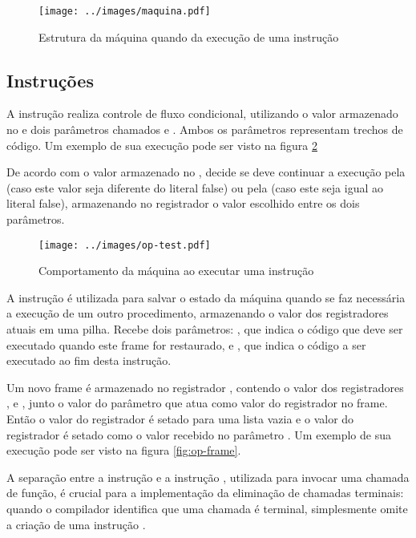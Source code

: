 \begin{figure}[h!]
\centering
\texttt{[image: ../images/maquina.pdf]}
\caption{Estrutura da máquina quando da execução de uma instrução }
\label{fig:maquina}
\end{figure}


\subsection{Instruções}
\label{ss:instrucoes}

A instrução  realiza controle de fluxo condicional, utilizando o
valor armazenado no  e dois parâmetros chamados
 e . Ambos os parâmetros representam
trechos de código. Um exemplo de sua execução pode ser visto na figura
\ref{fig:op-test}

De acordo com o valor armazenado no , decide se deve continuar
a execução pela  (caso este valor seja diferente do literal
false) ou pela  (caso este seja igual ao literal false),
armazenando no registrador  o valor escolhido entre os dois
parâmetros.

\begin{figure}[h!]
\centering
\texttt{[image: ../images/op-test.pdf]}
\caption{Comportamento da máquina ao executar uma instrução }
\label{fig:op-test}
\end{figure}

A instrução  é utilizada para salvar o estado da
máquina quando se faz necessária a execução de um outro procedimento,
armazenando o valor dos registradores atuais em uma pilha. Recebe dois
parâmetros: , que indica o código que deve ser executado quando
este frame for restaurado, e , que indica o código a ser
executado ao fim desta instrução.

Um novo frame é armazenado no registrador , contendo o valor dos
registradores ,  e , junto o valor do
parâmetro  que atua como valor do registrador  no
frame. Então o valor do registrador  é setado para uma lista vazia
e o valor do registrador  é setado como o valor recebido no
parâmetro . Um exemplo de sua execução pode ser visto na figura
\ref{fig:op-frame}.

A separação entre a instrução  e a instrução ,
utilizada para invocar uma chamada de função, é crucial para a implementação da
eliminação de chamadas terminais: quando o compilador identifica que uma
chamada é terminal, simplesmente omite a criação de uma instrução .

